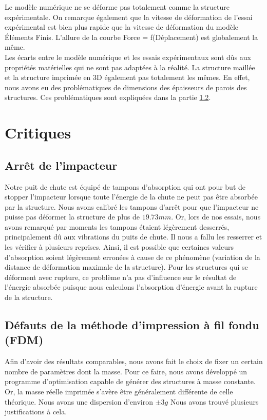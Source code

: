 \documentclass[a4paper]{article}
\begin{document}
	\hspace{0.5cm}Le modèle numérique ne se déforme pas totalement comme la structure expérimentale. On remarque également que la vitesse de déformation de l'essai expérimental est bien plus rapide que la vitesse de déformation du modèle  Éléments Finis. L'allure de la courbe Force = f(Déplacement) est globalement la même.\\
	
	\hspace{0.5cm}Les écarts entre le modèle numérique et les essais expérimentaux sont dûs aux propriétés matérielles qui ne sont pas adaptées à la réalité. La structure maillée et la structure imprimée en 3D également pas totalement les mêmes. En effet, nous avons eu des problématiques de dimensions des épaisseurs de parois des structures. Ces problématiques sont expliquées dans la partie \ref{critique_fdm}.
	\newpage
	
	
	\section{Critiques}
	\subsection{Arrêt de l'impacteur}
	
	\hspace{0.5cm}Notre puit de chute est équipé de tampons d'absorption qui ont pour but de stopper l’impacteur lorsque toute l’énergie de la chute ne peut pas être absorbée par la structure. Nous avons calibré les tampons d'arrêt pour que l'impacteur ne puisse pas déformer la structure de plus de $19.73 mm$. Or, lors de nos essais, nous avons remarqué par moments les tampons étaient légèrement desserrés, principalement dû aux vibrations du puits de chute. Il nous a fallu les resserrer et les vérifier à plusieurs reprises. Ainsi, il est possible que certaines valeurs d'absorption soient légèrement erronées à cause de ce phénomène (variation de la distance de déformation maximale de la structure). Pour les structures qui se déforment avec rupture, ce problème n’a pas d'influence sur le résultat de l’énergie absorbée puisque nous calculons l'absorption d'énergie avant la rupture de la structure.
	
	\subsection{Défauts de la méthode d'impression à fil fondu (FDM)}
	\label{critique_fdm}
	\hspace{0.5cm}Afin d’avoir des résultats comparables, nous avons fait le choix de fixer un certain nombre de paramètres dont la masse. 
	Pour ce faire, nous avons développé un programme d’optimisation capable de générer des structures à masse constante. Or, la masse réelle imprimée s’avère être généralement différente de celle théorique. Nous avons une dispersion d'environ $\pm 3 g$ Nous avons trouvé plusieurs justifications à cela.\\
	
\end{document}
